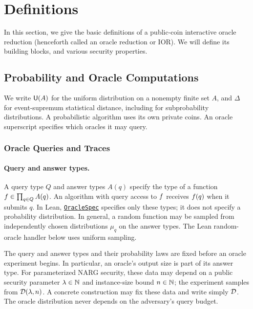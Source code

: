 \section{Definitions}\label{sec:oracle_reductions_defs}

In this section, we give the basic definitions of a public-coin interactive oracle reduction
(henceforth called an oracle reduction or IOR). We will define its building blocks, and various
security properties.

\subsection{Probability and Oracle Computations}
\label{sec:finite_probability_interface}

We write \(\mathsf{U}(A)\) for the uniform distribution on a nonempty finite set \(A\),
and \(\Delta\) for event-supremum statistical distance, including for subprobability distributions.
A probabilistic algorithm uses its own private coins. An oracle superscript specifies
which oracles it may query.

\subsubsection{Oracle Queries and Traces}
\label{sec:oracle_trace_interface}

\paragraph{Query and answer types.}
A query type \(Q\) and answer types \(A(q)\) specify the type of a function
\(f\in\prod_{q\in Q}A(q)\). An algorithm with query access to \(f\)
receives \(f(q)\) when it submits \(q\). In Lean,
\href{../docs/find/\#doc/OracleSpec}{\texttt{OracleSpec}}
specifies only these types; it does not specify a probability distribution.
In general, a random function may be sampled from independently chosen
distributions \(\mu_q\) on the answer types. The Lean random-oracle handler
below uses uniform sampling.

The query and answer types and their probability laws are fixed before an oracle experiment begins. In particular, an oracle's output size is part of its answer type. For parameterized NARG security, these data may depend on a public security parameter \(\lambda\in\mathbb N\) and instance-size bound \(n\in\mathbb N\); the experiment samples from \(\mathcal{D}(\lambda,n)\). A concrete construction may fix these data and write simply \(\mathcal{D}\). The oracle distribution never depends on the adversary's query budget.

